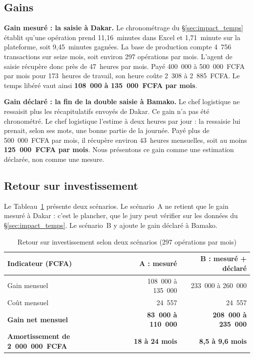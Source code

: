 \subsection{Gains}
\label{sec:roi_gains}

\textbf{Gain mesuré : la saisie à Dakar.} Le chronométrage du §\ref{sec:impact_temps} établit qu'une opération prend 11,16~minutes dans Excel et 1,71~minute sur la plateforme, soit 9,45~minutes gagnées. La base de production compte 4~756 transactions sur seize mois, soit environ 297 opérations par mois. L'agent de saisie récupère donc près de 47~heures par mois. Payé 400~000 à 500~000~FCFA par mois pour 173~heures de travail, son heure coûte 2~308 à 2~885~FCFA. Le temps libéré vaut ainsi \textbf{108~000 à 135~000~FCFA par mois}.

\textbf{Gain déclaré : la fin de la double saisie à Bamako.} Le chef logistique ne ressaisit plus les récapitulatifs envoyés de Dakar. Ce gain n'a pas été chronométré. Le chef logistique l'estime à deux heures par jour : la ressaisie lui prenait, selon ses mots, une bonne partie de la journée. Payé plus de 500~000~FCFA par mois, il récupère environ 43~heures mensuelles, soit au moins \textbf{125~000~FCFA par mois}. Nous présentons ce gain comme une estimation déclarée, non comme une mesure.

\subsection{Retour sur investissement}
\label{sec:roi_calcul}

Le Tableau~\ref{tab:roi_scenarios} présente deux scénarios. Le scénario~A ne retient que le gain mesuré à Dakar : c'est le plancher, que le jury peut vérifier sur les données du §\ref{sec:impact_temps}. Le scénario~B y ajoute le gain déclaré à Bamako.

\begin{table}[H]
\centering
\footnotesize
\caption{Retour sur investissement selon deux scénarios (297 opérations par mois)}
\label{tab:roi_scenarios}
\begin{tabularx}{\linewidth}{|>{\raggedright\arraybackslash}X|r|r|}
\hline
\rowcolor[HTML]{EFEFEF}
\textbf{Indicateur (FCFA)} & \textbf{A : mesuré} & \textbf{B : mesuré + déclaré} \\ \hline
Gain mensuel & 108~000 à 135~000 & 233~000 à 260~000 \\ \hline
Coût mensuel & 24~557 & 24~557 \\ \hline
\textbf{Gain net mensuel} & \textbf{83~000 à 110~000} & \textbf{208~000 à 235~000} \\ \hline
\textbf{Amortissement de 2~000~000~FCFA} & \textbf{18 à 24 mois} & \textbf{8,5 à 9,6 mois} \\ \hline
\end{tabularx}
\end{table}

